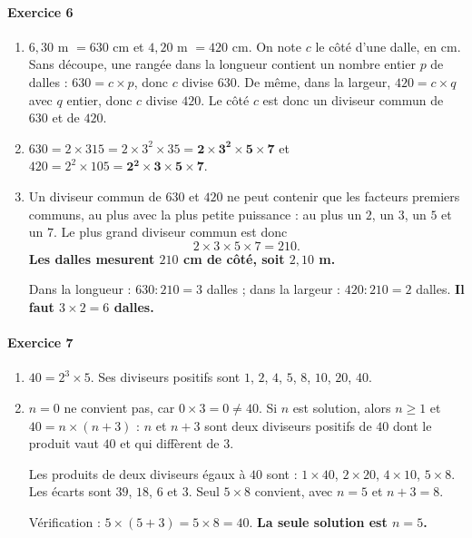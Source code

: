 \documentclass[11pt,a4paper]{article}
\newcommand{\exo}[1]{\paragraph{Exercice #1}}
\newcommand{\rep}[1]{\textbf{#1}}
\begin{document}
\exo{6}
\begin{enumerate}[label=\rep{\arabic*.}]
  \item $6{,}30$ m $= 630$ cm et $4{,}20$ m $= 420$ cm. On note $c$ le côté d'une dalle, en cm. Sans découpe, une rangée dans la longueur contient un nombre entier $p$ de dalles : $630 = c \times p$, donc $c$ divise $630$. De même, dans la largeur, $420 = c \times q$ avec $q$ entier, donc $c$ divise $420$. Le côté $c$ est donc un diviseur commun de $630$ et de $420$.

  \item $630 = 2 \times 315 = 2 \times 3^2 \times 35 = \mathbf{2 \times 3^2 \times 5 \times 7}$ \qquad et \qquad $420 = 2^2 \times 105 = \mathbf{2^2 \times 3 \times 5 \times 7}$.

  \item Un diviseur commun de $630$ et $420$ ne peut contenir que les facteurs premiers communs, au plus avec la plus petite puissance : au plus un $2$, un $3$, un $5$ et un $7$. Le plus grand diviseur commun est donc
  \[ 2 \times 3 \times 5 \times 7 = 210. \]
  \rep{Les dalles mesurent $210$ cm de côté, soit $2{,}10$ m.}

  Dans la longueur : $630 : 210 = 3$ dalles ; dans la largeur : $420 : 210 = 2$ dalles. \rep{Il faut $3 \times 2 = 6$ dalles.}
\end{enumerate}

\exo{7}
\begin{enumerate}[label=\rep{\arabic*.}]
  \item $40 = 2^3 \times 5$. Ses diviseurs positifs sont $1$, $2$, $4$, $5$, $8$, $10$, $20$, $40$.

  \item $n = 0$ ne convient pas, car $0 \times 3 = 0 \neq 40$. Si $n$ est solution, alors $n \geq 1$ et $40 = n \times (n+3)$ : $n$ et $n + 3$ sont deux diviseurs positifs de $40$ dont le produit vaut $40$ et qui diffèrent de $3$.

  Les produits de deux diviseurs égaux à $40$ sont : $1 \times 40$, $2 \times 20$, $4 \times 10$, $5 \times 8$. Les écarts sont $39$, $18$, $6$ et $3$. Seul $5 \times 8$ convient, avec $n = 5$ et $n + 3 = 8$.

  Vérification : $5 \times (5 + 3) = 5 \times 8 = 40$. \rep{La seule solution est $n = 5$.}
\end{enumerate}
\end{document}
